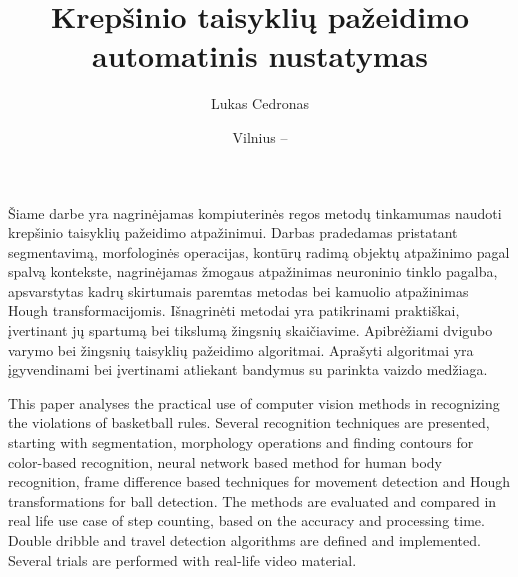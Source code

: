 \documentclass{VUMIFPSbakalaurinis}
\institute{Informatikos institutas}  %
\title{Krepšinio taisyklių pažeidimo automatinis nustatymas	}
\author{Lukas Cedronas}
\date{Vilnius – \the\year}
\begin{document}
\maketitle
\setcounter{page}{2}



Šiame darbe yra nagrinėjamas kompiuterinės regos metodų tinkamumas naudoti krepšinio taisyklių pažeidimo atpažinimui. Darbas pradedamas pristatant segmentavimą, morfologinės operacijas, kontūrų radimą objektų atpažinimo pagal spalvą kontekste, nagrinėjamas žmogaus atpažinimas neuroninio tinklo pagalba, apsvarstytas kadrų skirtumais paremtas metodas bei kamuolio atpažinimas Hough transformacijomis. Išnagrinėti metodai yra patikrinami praktiškai, įvertinant jų spartumą bei tikslumą žingsnių skaičiavime. Apibrėžiami dvigubo varymo bei žingsnių taisyklių pažeidimo algoritmai. Aprašyti algoritmai yra įgyvendinami bei įvertinami atliekant bandymus su parinkta vaizdo medžiaga. 


This paper analyses the practical use of computer vision methods in recognizing the violations of basketball rules. Several recognition techniques are presented, starting with segmentation, morphology operations and finding contours for color-based recognition, neural network based method for human body recognition, frame difference based techniques for movement detection and Hough transformations for ball detection. The methods are evaluated and compared in real life use case of step counting, based on the accuracy and processing time. Double dribble and travel detection  algorithms are defined and implemented. Several trials are performed with real-life video material. 

\tableofcontents

\end{document}
